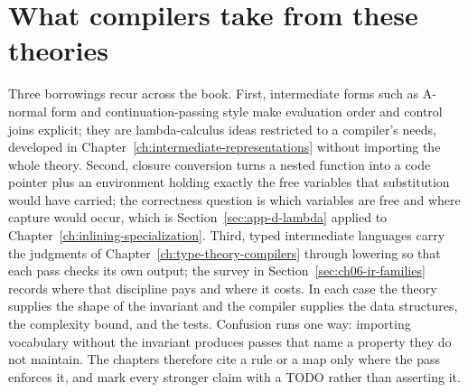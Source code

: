 \section{What compilers take from these theories}
\label{sec:app-d-compiler-use}

Three borrowings recur across the book.
First, intermediate forms such as A-normal form and continuation-passing style make evaluation order and control joins explicit; they are lambda-calculus ideas restricted to a compiler's needs, developed in Chapter~\ref{ch:intermediate-representations} without importing the whole theory.
Second, closure conversion turns a nested function into a code pointer plus an environment holding exactly the free variables that substitution would have carried; the correctness question is which variables are free and where capture would occur, which is Section~\ref{sec:app-d-lambda} applied to Chapter~\ref{ch:inlining-specialization}.
Third, typed intermediate languages carry the judgments of Chapter~\ref{ch:type-theory-compilers} through lowering so that each pass checks its own output; the survey in Section~\ref{sec:ch06-ir-families} records where that discipline pays and where it costs.
In each case the theory supplies the shape of the invariant and the compiler supplies the data structures, the complexity bound, and the tests.
Confusion runs one way: importing vocabulary without the invariant produces passes that name a property they do not maintain.
The chapters therefore cite a rule or a map only where the pass enforces it, and mark every stronger claim with a TODO rather than asserting it.
